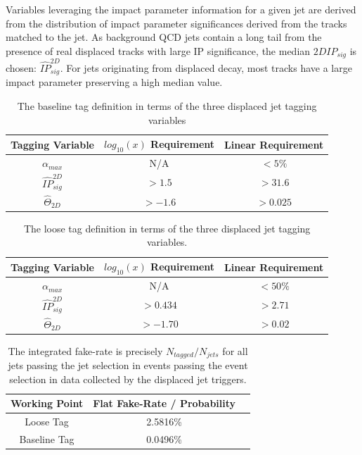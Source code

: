 Variables leveraging the impact parameter information for a given jet are derived from the distribution of impact parameter significances derived
from the tracks matched to the jet. As background QCD jets contain a long tail from the presence of real displaced tracks with large IP significance,
the median $2DIP_{sig}$ is chosen: $\hat{IP}^{2D}_{sig}$. For jets originating from displaced decay, most tracks have a large impact parameter 
preserving a high median value. 

\begin{table}
\begin{center}
\caption{The baseline tag definition in terms of the three displaced jet tagging variables \label{tab:tag_def}}
\begin{tabular}{|c|c|c|}
\hline 
\textbf{Tagging Variable} & \textbf{$log_{10}(x)$ Requirement} & \textbf{Linear Requirement}\\
\hline 
$\alpha_{max}$  & N/A &  $<5\%$ \\
\hline 
$\hat{IP}^{2D}_{sig}$  &  $>1.5$ & $>31.6$ \\
\hline 
$\hat{\Theta}_{2D}$  &  $>-1.6$ & $>0.025$\\
\hline 
\end{tabular}
\end{center}
\end{table}

\begin{table}
\caption{The loose tag definition in terms of the three displaced jet tagging variables. \label{tab:loose_tag_def}}
\begin{center}
\begin{tabular}{|c|c|c|}
\hline 
\textbf{Tagging Variable} & \textbf{$log_{10}(x)$ Requirement} & \textbf{Linear Requirement}\\
\hline 
$\alpha_{max}$  &  N/A & $<50\%$\\
\hline 
$\hat{IP}^{2D}_{sig}$  &  $>0.434$ &  $>2.71$\\
\hline 
$\hat{\Theta}_{2D}$  &  $>-1.70$ & $>0.02$ \\
\hline 
\end{tabular}
\end{center}
\end{table}

\begin{table}
\caption{The integrated fake-rate is precisely $N_{tagged}/N_{jets}$ for all jets passing the jet selection in events
passing the event selection in data collected by the displaced jet triggers. \label{tab:fake_rate_wp}}
\begin{center}
\begin{tabular}{|c|c|c|}
\hline 
\textbf{Working Point} & Flat Fake-Rate / Probability \\
\hline 
Loose Tag & 2.5816\%\\
\hline 
Baseline Tag & 0.0496\%\\
\hline 
\end{tabular}

\end{center}
\end{table}



